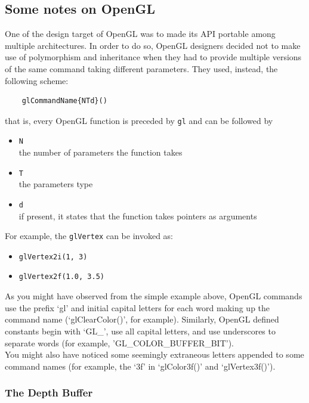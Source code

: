 \subsection{Some notes on OpenGL}
\label{sec:opengl:opengl_notes}
\lstset{language=C++}

One of the design target of OpenGL was to made its API portable 
among multiple architectures. In order to do so, OpenGL 
designers decided not to make use of polymorphism and inheritance 
when they had to provide multiple versions of the same command 
taking different parameters. They used, instead, the following scheme:

\begin{verbatim}
    glCommandName{NTd}()
\end{verbatim}

that is, every OpenGL function is preceded by \texttt{gl} and can be 
followed by

\begin{itemize}
  \item \texttt{N} \\
    the number of parameters the function takes
  \item \texttt{T} \\
    the parameters type
  \item \texttt{d} \\
    if present, it states that the function takes pointers as arguments
\end{itemize}

For example, the \texttt{glVertex} can be invoked as:

\begin{itemize}
\item \texttt{glVertex2i(1, 3)}
\item \texttt{glVertex2f(1.0, 3.5)}
\end{itemize}

As you might have observed from the simple example above,
OpenGL commands use the prefix `gl' and initial capital letters
for each word making up the command name (`glClearColor()', for
example). Similarly, OpenGL defined constants begin with `GL\_', use all
capital letters, and use underscores to separate words (for example,
'GL\_COLOR\_BUFFER\_BIT').
\\
You might also have noticed some seemingly extraneous letters appended to
some command names (for example, the `3f' in `glColor3f()' and `glVertex3f()').

\subsubsection{The Depth Buffer}
\label{sec:opengl:opengl_note:depth_buffer}

